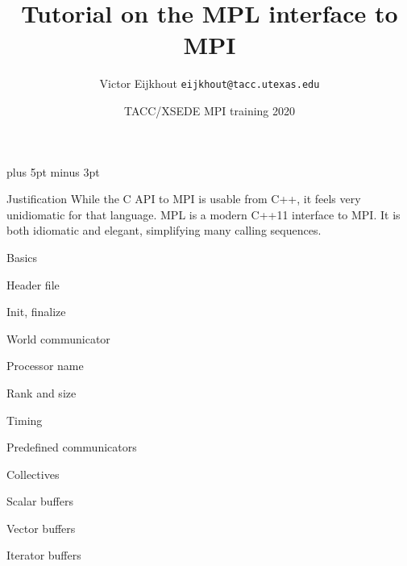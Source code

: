 \documentclass[11pt,headernav]{beamer}
\newcounter{tacc}
\def\Location{}%
\def\courseyear{2020}
\def\Location{TACC APP institute MPI training \courseyear}
\def\Location{TACC/XSEDE MPI training \courseyear}
\begin{document}
\parskip=10pt plus 5pt minus 3pt

\title{Tutorial on the MPL interface to MPI}
\author{Victor Eijkhout {\tt eijkhout@tacc.utexas.edu}}
\date{\Location}

\begin{frame}
  \titlepage
\end{frame}

\begin{xsede}
  
\end{xsede}

\begin{frame}{Justification}
  While the C API to MPI is usable from C++, it feels very unidiomatic
  for that language.
  MPL is a modern C++11 interface to MPI.
  It is both idiomatic and elegant, simplifying many calling sequences.
\end{frame}

 {Basics}

\begin{frame}[containsverbatim]{Header file}
  
\end{frame}
\begin{frame}[containsverbatim]{Init, finalize}
  
\end{frame}
\begin{frame}[containsverbatim]{World communicator}
  
\end{frame}
\begin{frame}[containsverbatim]{Processor name}
  
\end{frame}
\begin{frame}[containsverbatim]{Rank and size}
  
\end{frame}
\begin{frame}[containsverbatim]{Timing}
  
\end{frame}
\begin{frame}[containsverbatim]{Predefined communicators}
  
\end{frame}

 {Collectives}

\begin{frame}[containsverbatim]{Scalar buffers}
  
\end{frame}
\begin{frame}[containsverbatim]{Vector buffers}
  
\end{frame}
\begin{frame}[containsverbatim]{Iterator buffers}
  
\end{frame}
\end{document}
